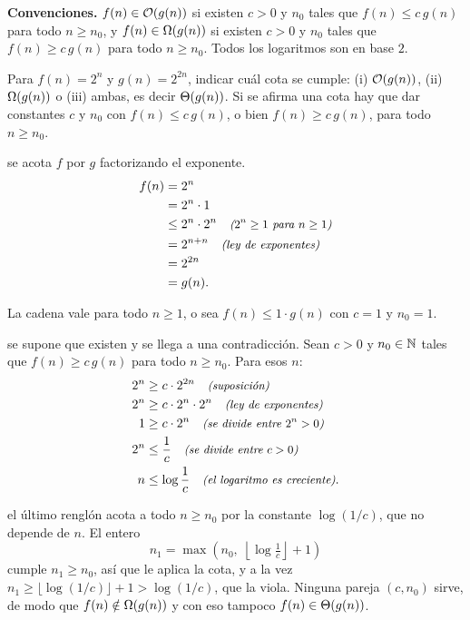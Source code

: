 \documentclass[11pt,letterpaper]{article}
\begin{document}

\noindent\textbf{Convenciones.}
$f(n) \in \mathcal{O}\!\left(g(n)\right)$ si existen $c > 0$ y $n_0$ tales que
$f(n) \le c\,g(n)$ para todo $n \ge n_0$, y
$f(n) \in \Omega\!\left(g(n)\right)$ si existen $c > 0$ y $n_0$ tales que
$f(n) \ge c\,g(n)$ para todo $n \ge n_0$. Todos los logaritmos son en base $2$.

\noindent Para $f(n) = 2^{n}$ y $g(n) = 2^{2n}$, indicar cuál cota se
cumple: (i) $\mathcal{O}\!\left(g(n)\right)$, (ii) $\Omega\!\left(g(n)\right)$ o (iii) ambas, es decir
$\Theta\!\left(g(n)\right)$. Si se afirma una cota hay que dar constantes $c$ y
$n_0$ con $f(n) \le c\,g(n)$, o bien $f(n) \ge c\,g(n)$, para todo
$n \ge n_0$.

 se acota $f$ por $g$ factorizando el exponente.
\begin{align*}
  f(n) &= 2^{n} \\
       &= 2^{n} \cdot 1 \\
       &\le 2^{n} \cdot 2^{n}
          \quad\text{\small\itshape ($2^{n} \ge 1$ para $n \ge 1$)} \\
       &= 2^{n + n}
          \quad\text{\small\itshape (ley de exponentes)} \\
       &= 2^{2n} \\
       &= g(n).
\end{align*}

La cadena vale para todo $n \ge 1$, o sea $f(n) \le 1 \cdot g(n)$ con
$c = 1$ y $n_0 = 1$.

 se supone que existen y se llega a una
contradicción. Sean $c > 0$ y $n_0 \in \mathbb{N}$ tales que
$f(n) \ge c\,g(n)$ para todo $n \ge n_0$. Para esos $n$:
\begin{align*}
  2^{n} &\ge c \cdot 2^{2n}
        \quad\text{\small\itshape (suposición)} \\
  2^{n} &\ge c \cdot 2^{n} \cdot 2^{n}
        \quad\text{\small\itshape (ley de exponentes)} \\
  1 &\ge c \cdot 2^{n}
        \quad\text{\small\itshape (se divide entre $2^{n} > 0$)} \\
  2^{n} &\le \frac{1}{c}
        \quad\text{\small\itshape (se divide entre $c > 0$)} \\
  n &\le \log \frac{1}{c}
        \quad\text{\small\itshape (el logaritmo es creciente)}.
\end{align*}

 el último renglón acota a todo $n \ge n_0$ por
la constante $\log(1/c)$, que no depende de $n$. El entero
\[
  n_1 = \max\!\left(n_0,\;
        \left\lfloor \log \tfrac{1}{c} \right\rfloor + 1\right)
\]
cumple $n_1 \ge n_0$, así que le aplica la cota, y a la vez
$n_1 \ge \lfloor \log(1/c) \rfloor + 1 > \log(1/c)$, que la viola.
Ninguna pareja $(c, n_0)$ sirve, de modo que $f(n) \notin \Omega\!\left(g(n)\right)$
y con eso tampoco $f(n) \in \Theta\!\left(g(n)\right)$.

\end{document}
